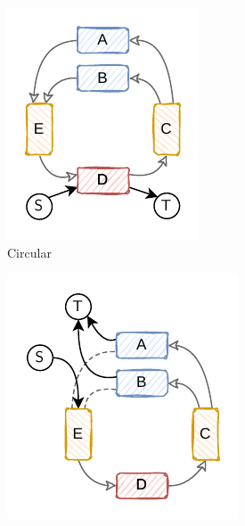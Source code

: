\begin{figure}
  \centering
  \begin{subfigure}{0.3\linewidth}
    \centering
    \includegraphics[width=0.85\linewidth]{plasmid_structures/img/plasmid_structure-circular.pdf}
    \caption{Circular}%
    \label{subfig:plasmid_structure:circular}
  \end{subfigure}
  \hfill
  \begin{subfigure}{0.3\linewidth}
    \centering
    \includegraphics[width=\linewidth]{plasmid_structures/img/plasmid_structure-pc_multi_t.pdf}

\end{subfigure}
\end{figure}
